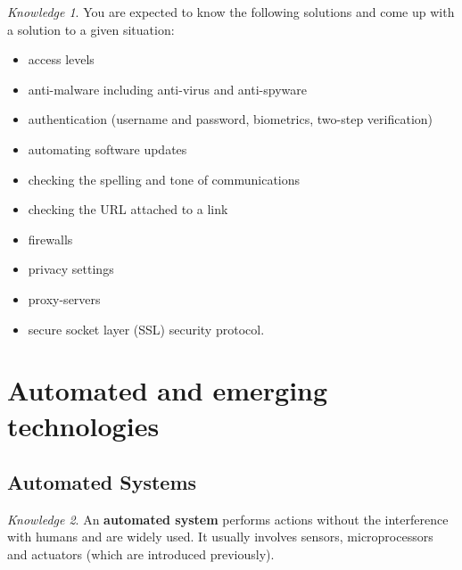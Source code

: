 \documentclass[8pt]{article}
\theoremstyle{remark}
\newtheorem{knowledge}{Knowledge}[subsection]
\begin{document}
            \begin{knowledge}
                You are expected to know the following solutions and come up with a solution to a given situation:
                \begin{itemize}
                    \item access levels
                    \item anti-malware including anti-virus and anti-spyware
                    \item authentication (username and password, biometrics, two-step verification)
                    \item automating software updates
                    \item checking the spelling and tone of communications
                    \item checking the URL attached to a link
                    \item firewalls
                    \item privacy settings
                    \item proxy-servers
                    \item secure socket layer (SSL) security protocol.
                \end{itemize}
            \end{knowledge}

            \section{Automated and emerging technologies}

        \subsection{Automated Systems}
            \begin{knowledge}
                An \textbf{automated system} performs actions without the interference with humans and are widely used. It usually involves sensors, microprocessors and actuators (which are introduced previously).
            \end{knowledge}
\end{document}
